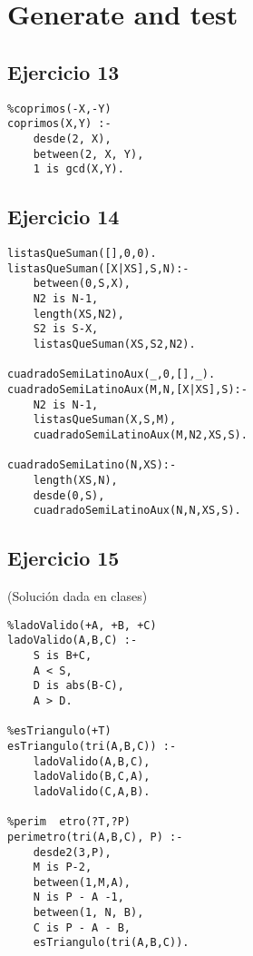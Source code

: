 \documentclass[10pt,a4paper]{article}
\begin{document}
\section*{Generate and test}

\subsection{Ejercicio 13}
\begin{centrado}
\begin{verbatim}
%coprimos(-X,-Y)
coprimos(X,Y) :-
	desde(2, X),
	between(2, X, Y),
	1 is gcd(X,Y).
\end{verbatim}
\end{centrado}
\subsection{Ejercicio 14}
\begin{centrado}
\begin{verbatim}
listasQueSuman([],0,0).
listasQueSuman([X|XS],S,N):-
    between(0,S,X),
    N2 is N-1,
    length(XS,N2), 
    S2 is S-X, 
    listasQueSuman(XS,S2,N2).

cuadradoSemiLatinoAux(_,0,[],_).
cuadradoSemiLatinoAux(M,N,[X|XS],S):- 
	N2 is N-1, 
	listasQueSuman(X,S,M),
	cuadradoSemiLatinoAux(M,N2,XS,S).

cuadradoSemiLatino(N,XS):-
	length(XS,N),
	desde(0,S),
	cuadradoSemiLatinoAux(N,N,XS,S).
\end{verbatim}
\end{centrado}

\subsection{Ejercicio 15}
(Solución dada en clases)
\begin{centrado}
\begin{verbatim}
%ladoValido(+A, +B, +C)
ladoValido(A,B,C) :-
	S is B+C,
	A < S,
	D is abs(B-C),
	A > D.

%esTriangulo(+T)
esTriangulo(tri(A,B,C)) :-
	ladoValido(A,B,C),
	ladoValido(B,C,A),
	ladoValido(C,A,B).

%perim  etro(?T,?P)
perimetro(tri(A,B,C), P) :-
	desde2(3,P),
	M is P-2,
	between(1,M,A),
	N is P - A -1,
	between(1, N, B),
	C is P - A - B,
	esTriangulo(tri(A,B,C)).
\end{verbatim}
\end{centrado}
\end{document}
